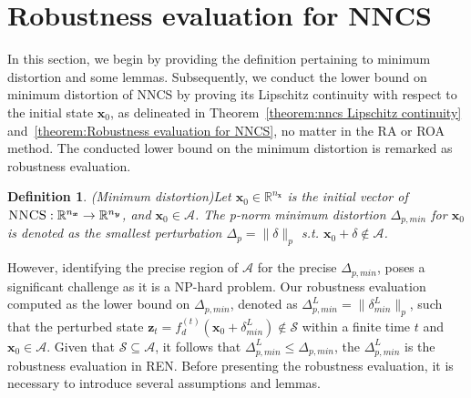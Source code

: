 \documentclass[conference]{IEEEtran}
\newtheorem{definition}{\bf Definition}
\newcommand{\ren}{\textsc{REN}\xspace}
\newcommand{\nncs}{\textsc{NNCS}\xspace}
\newcommand{\roa}{\textsc{ROA}\xspace}
\newcommand{\ra}{\textsc{RA}\xspace}
\newcommand{\myvec}[1]{\boldsymbol{#1}}
\newcommand{\calA}{\mathcal{A}}
\newcommand{\calS}{\mathcal{S}}
\newcommand{\bbR}{\mathbb{R}}
\begin{document}
\section{Robustness evaluation for \nncs}\label{sec:method}
In this section, we begin by providing 
the definition pertaining to minimum distortion and 
some lemmas. 
Subsequently, we conduct the lower bound on 
minimum distortion of \nncs by 
proving its Lipschitz continuity with 
respect to the initial state $\myvec{x}_{0}$, 
as delineated in Theorem~\ref{theorem:nncs Lipschitz continuity} 
and~\ref{theorem:Robustness evaluation for NNCS}, no matter in 
the \ra or \roa method. 
The conducted lower bound on the minimum 
distortion is remarked as robustness evaluation. 


\begin{definition}(Minimum distortion)\label{def:minimum distortion}
  Let $\myvec{x}_{0} \in \bbR^{n_{\myvec{x}}}$ is the initial 
  vector of $\nncs : \bbR^{n_{\myvec{x}}} \to \bbR^{n_{\myvec{y}}}$, 
  and $\myvec{x}_{0}\in \calA$. The 
  p-norm minimum distortion $\Delta_{p,min}$ for $\myvec{x}_{0}$ is denoted as the 
  smallest perturbation $\Delta_{p}= \lVert \delta \rVert_{p}$ s.t. 
  $\myvec{x}_{0}+\delta \notin \calA$. 
\end{definition}

However, identifying the precise 
region of $\calA$ for the precise $\Delta_{p,min}$, 
poses a significant challenge as it is a NP-hard problem. 
Our robustness evaluation computed as the 
lower bound on $\Delta_{p,min}$, 
denoted as $\Delta_{p,min}^{L}= \lVert 
  \delta_{min}^{L} \rVert_{p}$, 
such that the perturbed state $\myvec{z}_{t}=
f_{d}^{(t)}(\myvec{x}_{0}+
\delta_{min}^{L}) \notin \calS$ within a finite time $t$ 
and $\myvec{x}_{0} \in \calA$. 
Given that $\calS \subseteq \calA$, 
it follows that $\Delta_{p,min}^{L} \leq \Delta_{p,min}$, 
the $\Delta_{p,min}^{L}$ is the robustness evaluation in \ren. 
Before presenting the robustness evaluation, it is necessary 
to introduce several assumptions and lemmas.
\end{document}
